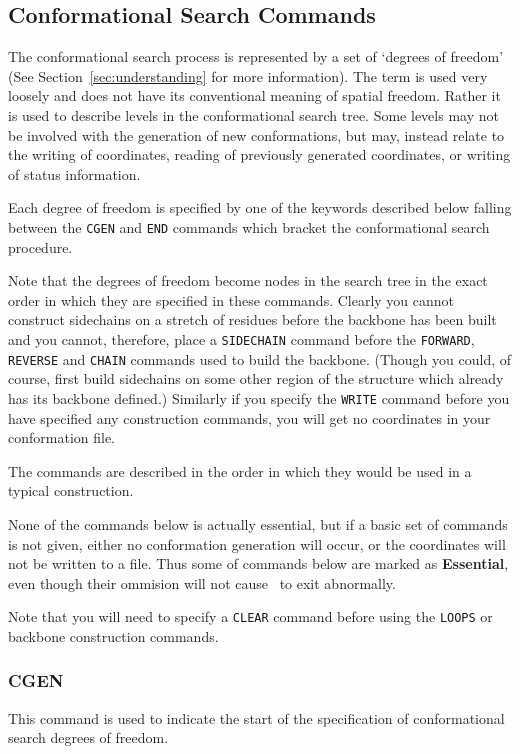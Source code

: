 \subsection{Conformational Search Commands}
The conformational search process is represented by a set of `degrees
of freedom' (See Section~\ref{sec:understanding} for more information).
The term is used very loosely and does not have its conventional meaning
of spatial freedom. Rather it is used to describe levels in the conformational
search tree. Some levels may not be involved with the generation of new
conformations, but may, instead relate to the writing of coordinates, reading
of previously generated coordinates, or writing of status information.

Each degree of freedom is specified by one of the keywords described below
falling between the {\tt CGEN} and {\tt END} commands which bracket the
conformational search procedure.

Note that the degrees of freedom become nodes in the search tree in the
exact order in which they are specified in these commands. Clearly you cannot
construct sidechains on a stretch of residues before the backbone has been
built and you cannot, therefore, place a {\tt SIDECHAIN} command before
the {\tt FORWARD}, {\tt REVERSE} and {\tt CHAIN} commands used to build the
backbone. (Though you could, of course, first build sidechains on some other 
region of the structure which already has its backbone defined.) Similarly
if you specify the {\tt WRITE} command before you have specified any
construction commands, you will get no coordinates in your conformation file.

The commands are described in the order in which they would be used in
a typical construction.

None of the commands below is actually essential, but if a basic set of
commands is not given, either no conformation generation will occur, or the
coordinates will not be written to a file. Thus some of commands below
are marked as {\bf Essential}, even though their ommision will not 
cause \cs\ to exit abnormally.

Note that you will need to specify a {\tt CLEAR} command before using the
{\tt LOOPS} or backbone construction commands.

\subsubsection{CGEN}
\es
This command is used to indicate the start of the specification of 
conformational search degrees of freedom.

